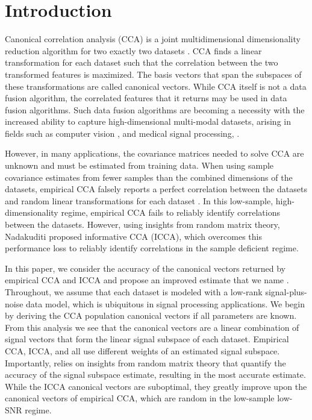 \section{Introduction}
Canonical correlation analysis (CCA) is a joint multidimensional dimensionality reduction
algorithm for two exactly two datasets \cite{hotelling1936relations}. CCA finds a linear
transformation for each dataset such that the correlation between the two transformed
features is maximized. The basis vectors that span the subspaces of these transformations
are called canonical vectors. While CCA itself is not a data fusion algorithm, the
correlated features that it returns may be used in data fusion algorithms.  Such data
fusion algorithms are becoming a necessity with the increased ability to capture
high-dimensional multi-modal datasets, arising in fields such as computer vision
\cite{hardoon2004canonical, dhillon2011multi,
  lisanti2014matching,ahsan2014clustering,hardoon2006correlation,chaudhuri2009multi}, and
medical signal processing, \cite{khalid2013improving, correa2010canonical,
  seoane2014canonical, spuler2013spatial, chen2014removal}.

However, in many applications, the covariance matrices needed to solve CCA are
unknown and must be estimated from training data. When using sample covariance
estimates from fewer samples than the combined dimensions of the datasets, empirical CCA
falsely reports a perfect correlation between the datasets and random linear
transformations for each dataset \cite{pezeshki2004empirical}. In this low-sample,
high-dimensionality regime, empirical CCA fails to reliably identify correlations between
the datasets. However, using insights from random matrix theory, Nadakuditi
\cite{nadakuditi2011fundamental} proposed informative CCA (ICCA), which overcomes this
performance loss to reliably identify correlations in the sample deficient regime.

In this paper, we consider the accuracy of the canonical vectors returned by empirical CCA
and ICCA and propose an improved estimate that we name \iccaps. Throughout, we assume that
each dataset is modeled with a low-rank signal-plus-noise data model, which is ubiquitous
in signal processing applications. We begin by deriving the CCA population canonical
vectors if all parameters are known. From this analysis we see that the canonical vectors
are a linear combination of signal vectors that form the linear signal subspace of each
dataset. Empirical CCA, ICCA, and \iccap all use different weights of an estimated signal
subspace. Importantly, \iccap relies on insights from random matrix theory that quantify
the accuracy of the signal subspace estimate, resulting in the most accurate
estimate. While the ICCA canonical vectors are suboptimal, they greatly improve upon the
canonical vectors of empirical CCA, which are random in the low-sample low-SNR regime.

